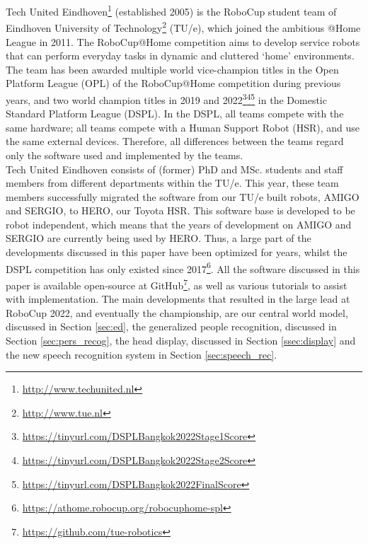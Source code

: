 Tech United Eindhoven\footnote{\url{http://www.techunited.nl}} (established 2005) is the RoboCup student team of Eindhoven University of Technology\footnote{\url{http://www.tue.nl}} (TU/e), which joined the ambitious @Home League in 2011. The RoboCup@Home competition aims to develop service robots that can perform everyday tasks in dynamic and cluttered `home' environments.
The team has been awarded multiple world vice-champion titles in the Open Platform League (OPL) of the RoboCup@Home competition during previous years, and two world champion titles in 2019 and 2022\footnote{\url{https://tinyurl.com/DSPLBangkok2022Stage1Score}}\footnote{\url{https://tinyurl.com/DSPLBangkok2022Stage2Score}}\footnote{\url{https://tinyurl.com/DSPLBangkok2022FinalScore}} in the Domestic Standard Platform League (DSPL). In the DSPL, all teams compete with the same hardware; all teams compete with a Human Support Robot (HSR), and use the same external devices. Therefore, all differences between the teams regard only the software used and implemented by the teams. \\

\noindent Tech United Eindhoven consists of (former) PhD and MSc. students and staff members from different departments within the TU/e. This year, these team members successfully migrated the software from our TU/e built robots, AMIGO and SERGIO, to HERO, our Toyota HSR. This software base is developed to be robot independent, which means that the years of development on AMIGO and SERGIO are currently being used by HERO. Thus, a large part of the developments discussed in this paper have been optimized for years, whilst the DSPL competition has only existed since 2017\footnote{\url{https://athome.robocup.org/robocuphome-spl}}. All the software discussed in this paper is available open-source at GitHub\footnote{\url{https://github.com/tue-robotics}}, as well as various tutorials to assist with implementation. The main developments that resulted in the large lead at RoboCup 2022, and eventually the championship, are our central world model, discussed in Section \ref{sec:ed}, the generalized people recognition, discussed in Section \ref{sec:pers_recog}, the head display, discussed in Section \ref{ssec:display} and the new speech recognition system in Section \ref{sec:speech_rec}.


